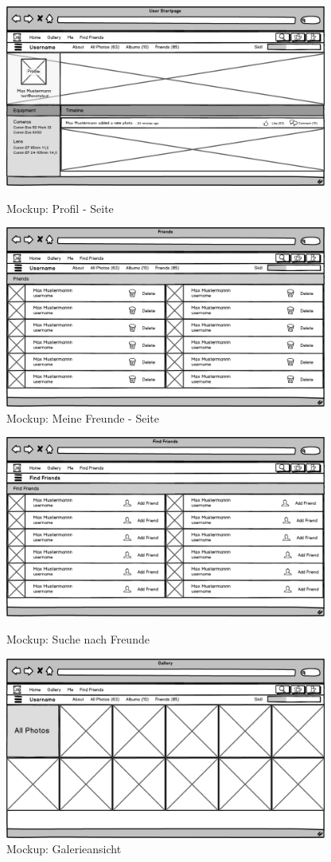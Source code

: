 \documentclass[a4paper,bibtotoc,oneside]{scrartcl}	%
\begin{document}
			\begin{figure}[H]
				\includegraphics[width=400px]{Mockups/05_profile.jpeg}
				\caption{Mockup: Profil - Seite}
				\includegraphics[width=400px]{Mockups/06_friends.jpeg}
				\caption{Mockup: Meine Freunde - Seite}
			\end{figure}
			\begin{figure}[H]
				\includegraphics[width=400px]{Mockups/07_find_friends.jpeg}
				\caption{Mockup: Suche nach Freunde}
				\includegraphics[width=400px]{Mockups/08_user_gallery.jpeg}
				\caption{Mockup: Galerieansicht}
			\end{figure}
\end{document}
